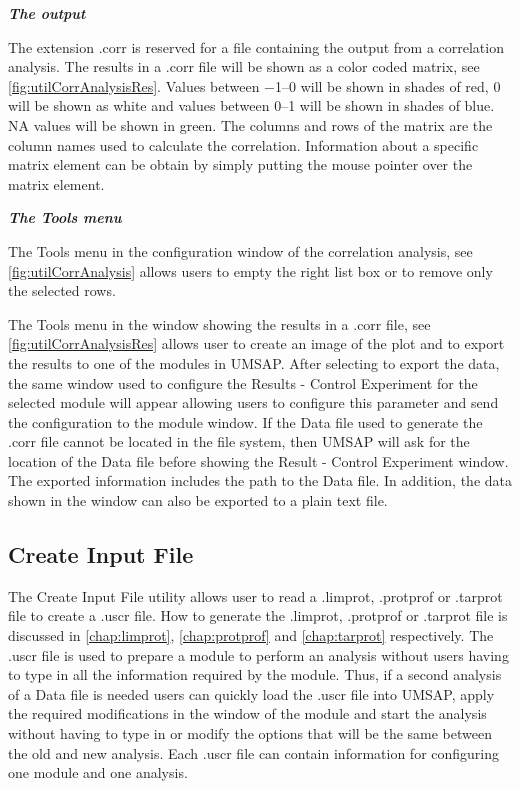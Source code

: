 \textit{\textbf{The output}}

The extension .corr is reserved for a file containing the output from a correlation analysis. The results in a .corr file will be shown as a color coded matrix, see \autoref{fig:utilCorrAnalysisRes}. Values between \numrange{-1}{0} will be shown in shades of red, \num{0} will be shown as white and values between \numrange{0}{1} will be shown in shades of blue. NA values will be shown in green. The columns and rows of the matrix are the column names used to calculate the correlation. Information about a specific matrix element can be obtain by simply putting the mouse pointer over the matrix element.  

\textit{\textbf{The Tools menu}}

The Tools menu in the configuration window of the correlation analysis, see \autoref{fig:utilCorrAnalysis} allows users to empty the right list box or to remove only the selected rows.

The Tools menu in the window showing the results in a .corr file, see \autoref{fig:utilCorrAnalysisRes} allows user to create an image of the plot and to export the results to one of the modules in UMSAP. After selecting to export the data, the same window used to configure the Results - Control Experiment for the selected module will appear allowing users to configure this parameter and send the configuration to the module window. If the Data file used to generate the .corr file cannot be located in the file system, then UMSAP will ask for the location of the Data file before showing the Result - Control Experiment window. The exported information includes the path to the Data file. In addition, the data shown in the window can also be exported to a plain text file. 

\subsection{Create Input File}
\label{subsec:utilUscrFile}

The Create Input File utility allows user to read a .limprot, .protprof or .tarprot file to create a .uscr file. How to generate the .limprot, .protprof or .tarprot file is discussed in \autoref{chap:limprot}, \autoref{chap:protprof} and \autoref{chap:tarprot} respectively. The .uscr file is used to prepare a module to perform an analysis without users having to type in all the information required by the module. Thus, if a second analysis of a Data file is needed users can quickly load the .uscr file into UMSAP, apply the required modifications in the window of the module and start the analysis without having to type in or modify the options that will be the same between the old and new analysis. Each .uscr file can contain information for configuring one module and one analysis.

